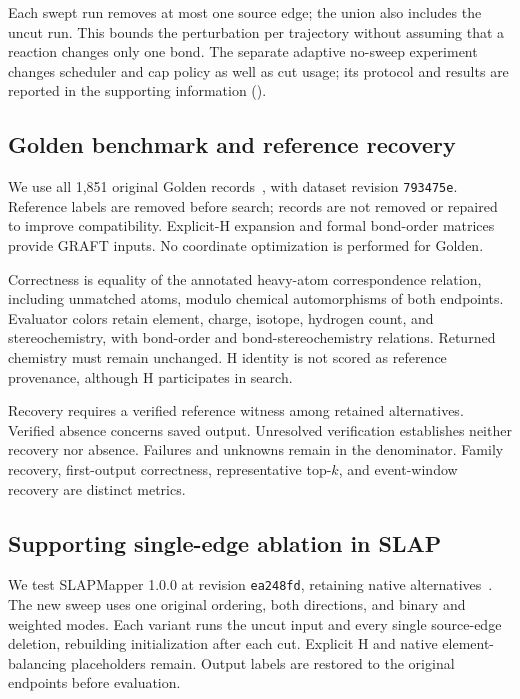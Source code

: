 Each swept run removes at most one source edge; the union also includes the uncut run. This bounds the perturbation per trajectory without assuming that a reaction changes only one bond. The separate adaptive no-sweep experiment changes scheduler and cap policy as well as cut usage; its protocol and results are reported in the supporting information ().

\subsection{Golden benchmark and reference recovery}

We use all 1,851 original Golden records~\citep{lin2022}, with dataset revision \texttt{793475e}. Reference labels are removed before search; records are not removed or repaired to improve compatibility. Explicit-H expansion and formal bond-order matrices provide GRAFT inputs. No coordinate optimization is performed for Golden.

Correctness is equality of the annotated heavy-atom correspondence relation, including unmatched atoms, modulo chemical automorphisms of both endpoints. Evaluator colors retain element, charge, isotope, hydrogen count, and stereochemistry, with bond-order and bond-stereochemistry relations. Returned chemistry must remain unchanged. H identity is not scored as reference provenance, although H participates in search.

Recovery requires a verified reference witness among retained alternatives. Verified absence concerns saved output. Unresolved verification establishes neither recovery nor absence. Failures and unknowns remain in the denominator. Family recovery, first-output correctness, representative top-$k$, and event-window recovery are distinct metrics.

\subsection{Supporting single-edge ablation in SLAP}

We test SLAPMapper 1.0.0 at revision \texttt{ea248fd}, retaining native alternatives~\citep{koda2025}. The new sweep uses one original ordering, both directions, and binary and weighted modes. Each variant runs the uncut input and every single source-edge deletion, rebuilding initialization after each cut. Explicit H and native element-balancing placeholders remain. Output labels are restored to the original endpoints before evaluation.

